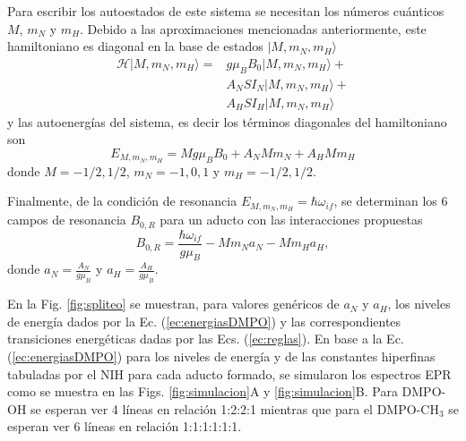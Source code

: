 \documentclass[aps,prl,reprint,superscriptaddress,showkeys]{revtex4-2}
\begin{document}
Para escribir los autoestados de este sistema se necesitan los números cuánticos $M$, $m_N$ y $m_H$. Debido a las aproximaciones mencionadas anteriormente, este hamiltoniano es diagonal en la base de estados $|M,m_N,m_H \rangle$ 
\begin{align}
    \mathcal{H} |M ,m_N, m_H \rangle = &g \mu_B B_0 |M ,m_N, m_H \rangle + \nonumber \\
    &A_N S I_N |M ,m_N, m_H \rangle + \nonumber \\
    &A_H S I_H |M ,m_N, m_H  \rangle
    \label{ec:hamiltoniano_DMPOOH}
\end{align}
y las autoenergías del sistema, es decir los términos diagonales del hamiltoniano son
\begin{equation}
    E_{M, m_N, m_H} = M g \mu_B B_0 + A_N M m_N +  A_H M m_H 
    \label{ec:energiasDMPO}
\end{equation}
donde $M = -1/2, 1/2$, $m_N=-1,0,1$ y $m_H=-1/2,1/2$.

Finalmente, de la condición de resonancia $E_{M, m_N, m_H} = \hbar \omega_{if}$, se determinan los 6 campos de resonancia $B_{0,R}$ para un aducto con las interacciones propuestas
\begin{equation}
B_{0,R} = \frac{\hbar\omega_{if}}{g \mu_B} -  M m_N a_N - M m_H a_H,    
\label{ec:campos}
\end{equation}
donde $a_N = \frac{A_N}{g \mu_B}$ y $a_H = \frac{A_H}{g\mu_B}$.

En la Fig. \ref*{fig:spliteo} se muestran, para valores genéricos de $a_N$ y $a_H$, los niveles de energía dados por la Ec. (\ref*{ec:energiasDMPO}) y las correspondientes transiciones energéticas dadas por las Ecs. (\ref*{ec:reglas}). En base a la Ec. (\ref*{ec:energiasDMPO}) para los niveles de energía y de las constantes hiperfinas tabuladas por el NIH para cada aducto formado, se simularon los espectros EPR como se muestra en las Figs. \ref*{fig:simulacion}A y \ref*{fig:simulacion}B. Para DMPO-OH se esperan ver 4 líneas en relación 1:2:2:1 mientras que para el DMPO-CH$_3$ se esperan ver 6 líneas en relación 1:1:1:1:1:1.
\end{document}
